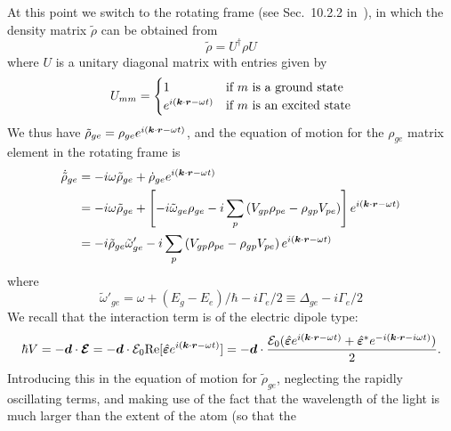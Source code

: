 At this point we switch to the rotating frame (see Sec.~10.2.2
in~\cite{auzinsh2010optically}), in which the density matrix $\tilde{\rho}$ can
be obtained from
\begin{equation}
 \tilde{\rho} = U^{\dagger} \rho U
\end{equation} 
where $U$ is a unitary diagonal matrix with entries given by 
\begin{equation} 
  U_{mm} = \begin{cases} 
   1 & \text{if  $m$ is a ground state} \\
   e^{i(\bm{k}\cdot\bm{r}-\omega t)} & \text{if $m$ is an excited state} 
  \end{cases}
\end{equation}
We thus have $\tilde{\rho}_{ge} = \rho_{ge} e^{i(\bm{k}\cdot\bm{r}-\omega t)}$,
and the equation of motion for the $\rho_{ge}$ matrix element in the rotating
frame is
\begin{equation}
\begin{split}
  \dot{\tilde{\rho}}_{ge} & = 
     -i\omega \tilde{\rho}_{ge} + \dot{\rho}_{ge} e^{i(\bm{k}\cdot\bm{r}-\omega t)} \\
     &  =  
     -i\omega \tilde{\rho}_{ge} + 
      \left[ 
     -i \tilde{\omega}_{ge}  \rho_{ge}  
     -i \sum_{p}\left( V_{gp} \rho_{pe} - \rho_{gp}V_{pe} \right) 
      \right] e^{i(\bm{k}\cdot\bm{r}-\omega t)}  \\ 
     &  =  
     -i \tilde{\rho}_{ge}\tilde{\omega}'_{ge}   
     -i \sum_{p}\left( V_{gp} \rho_{pe} - \rho_{gp}V_{pe}\right)  e^{i(\bm{k}\cdot\bm{r}-\omega t)}   
\end{split} 
\end{equation}
where 
\begin{equation}
  \tilde{\omega}'_{ge} = \omega + (E_{g} - E_{e})/\hbar - i \Gamma_{e}/2 
   \equiv  \Delta_{ge} - i \Gamma_{e}/2 
\end{equation}
We recall that the interaction term is of the electric dipole type: 
\begin{equation} 
  \hbar V = -\bm{d} \cdot \bm{\mathcal{E}} 
    =  -\bm{d} \cdot \mathcal{E}_{0} 
          \text{Re}[ \hat{\bm{\varepsilon}} e^{i(\bm{k}\cdot\bm{r} - \omega t )} ]
    =  -\bm{d} \cdot 
           \frac{  \mathcal{E}_{0} ( \hat{\bm{\varepsilon}} e^{i(\bm{k}\cdot\bm{r} - \omega t)} 
                + \hat{\bm{\varepsilon}}^{*} e^{-i(\bm{k}\cdot\bm{r}-i\omega t)} )}{2} .
\end{equation}
Introducing this in the equation of motion for $\tilde{\rho}_{ge}$, 
neglecting the rapidly oscillating terms, and making use of the fact that the
wavelength of the light is much larger than the extent of the atom (so that the

